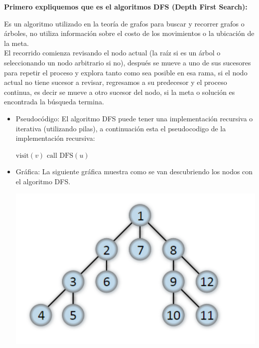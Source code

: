 \noindent \textbf{\large{Primero expliquemos que es el algoritmos DFS (Depth First Search):}}

Es un algoritmo utilizado en la teoría de grafos para buscar y recorrer grafos o árboles, no utiliza información sobre el costo de los movimientos o la ubicación de la meta.\\


El recorrido comienza revisando el nodo actual (la raíz si es un árbol o seleccionando un nodo arbitrario si no), después se mueve a uno de sus sucesores para repetir el proceso y explora tanto como sea posible en esa rama, si el nodo actual no tiene sucesor a revisar, regresamos a su predecesor y el proceso continua, es decir se mueve a otro sucesor del nodo, si la meta o solución es encontrada la búsqueda termina.

\begin{itemize}
    \item Pseudocódigo: El algoritmo DFS puede tener una implementación recursiva o iterativa (utilizando pilas), a continuación esta el pseudocodigo de la implementación recursiva:

    \begin{center}
        \begin{algorithmic}[1]
        \State $\text{visit}(v)$
            \State $\text{call DFS}(u)$
        \EndIf
    \EndFor
\EndProcedure
        \end{algorithmic}
    \end{center}

    \item Gráfica: La siguiente gráfica muestra como se van descubriendo los nodos con el algoritmo DFS.

    \begin{center}
        \includegraphics[scale = 0.5]{IMA/ejemploDFS.png}
    \end{center}


\end{itemize}
